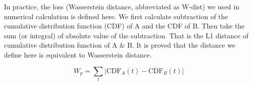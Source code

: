 In practice, the loss (Wasserstein distance, abbreviated as W-dist) we used in numerical calculation is defined here. We first calculate subtraction of the cumulative distribution function (CDF) of A and the CDF of B. Then take the sum (or integral) of absolute value of the subtraction. That is the L1 distance of cumulative distribution function of A \& B. It is proved that the distance we define here is equivalent to Wasserstein distance. 

\begin{equation}
    W_{p}=\sum_t|\mathrm{CDF}_A(t) - \mathrm{CDF}_B(t)|
\end{equation}
